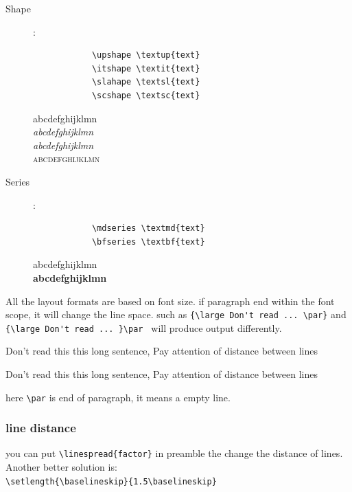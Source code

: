 \documentclass[a4paper,12pt,twoside]{book}
\begin{document}
\begin{CJK*}{UTF8}{song}
\begin{description}
			\item[Shape]:
			\begin{minipage}{0.45\textwidth}
			\begin{verbatim}
			\upshape \textup{text}
			\itshape \textit{text}
			\slahape \textsl{text}
			\scshape \textsc{text}
			\end{verbatim}
			\end{minipage}
			\begin{minipage}{0.45\textwidth}
			 \textup{abcdefghijklmn} \\
			 \textit{abcdefghijklmn}\\
			 \textsl{abcdefghijklmn}\\
			 \textsc{abcdefghijklmn}
			\end{minipage}
			\item[Series]:
			\begin{minipage}{0.45\textwidth}
			\begin{verbatim}
			\mdseries \textmd{text}
			\bfseries \textbf{text}
			\end{verbatim}
			\end{minipage}
			\begin{minipage}{0.45\textwidth}
			\textmd{abcdefghijklmn} \\
			\textbf{abcdefghijklmn}
			\end{minipage}
			\end{description}\par
			All the layout formats are based on font size. if paragraph end within the font scope, it will change the line space. such as
			\verb={\large Don't read ... \par}= and \verb={\large Don't read ... }\par = will produce output differently. \par
			{\large Don't read this this long sentence, Pay attention of distance between lines \par}
			{\large Don't read this this long sentence, Pay attention of distance between lines }\par
			here \verb=\par= is end of paragraph, it means a empty line.	
			
		\subsubsection{line distance}
			you can put \verb=\linespread{factor}= in preamble the change the distance of lines. Another better solution is: \\
			\verb=\setlength{\baselineskip}{1.5\baselineskip}=

\end{CJK*}
\end{document}
